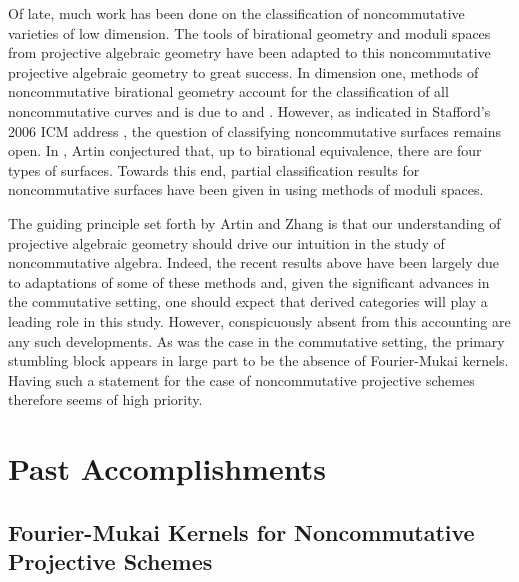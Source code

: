 \documentclass[11pt]{article}
\begin{document}
Of late, much work has been done on the classification of noncommutative varieties of low dimension.
The tools of birational geometry and moduli spaces from projective algebraic geometry have been adapted to this noncommutative projective algebraic geometry to great success.
In dimension one, methods of noncommutative birational geometry account for the classification of all noncommutative curves and is due to \cite{AS95} and \cite{Reiten-VdB}.
However, as indicated in Stafford's 2006 ICM address \cite{Stafford02}, the question of classifying noncommutative surfaces remains open.
In \cite{ArtinConj}, Artin conjectured that, up to birational equivalence, there are four types of surfaces.
Towards this end, partial classification results for noncommutative surfaces have been given in \cite{ATV,Stephenson96,Stephenson97} using methods of moduli spaces.

The guiding principle set forth by Artin and Zhang is that our understanding of projective algebraic geometry should drive our intuition in the study of noncommutative algebra.
Indeed, the recent results above have been largely due to adaptations of some of these methods and, given the significant advances in the commutative setting, one should expect that derived categories will play a leading role in this study.
However, conspicuously absent from this accounting are any such developments.
As was the case in the commutative setting, the primary stumbling block appears in large part to be the absence of Fourier-Mukai kernels.
Having such a statement for the case of noncommutative projective schemes therefore seems of high priority.
\section{Past Accomplishments}

\subsection{Fourier-Mukai Kernels for Noncommutative Projective Schemes}
\end{document}
